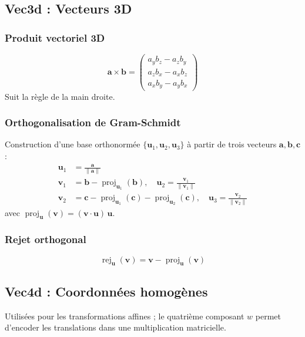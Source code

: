 \documentclass[11pt,a4paper]{article}
\begin{document}
\subsection{Vec3d : Vecteurs 3D}

\subsubsection{Produit vectoriel 3D}
\[
\mathbf{a} \times \mathbf{b} =
\begin{pmatrix}
a_y b_z - a_z b_y \\
a_z b_x - a_x b_z \\
a_x b_y - a_y b_x
\end{pmatrix}
\]
Suit la règle de la main droite.

\subsubsection{Orthogonalisation de Gram-Schmidt}

Construction d'une base orthonormée $\{\mathbf{u}_1, \mathbf{u}_2, \mathbf{u}_3\}$ à partir de trois vecteurs $\mathbf{a}, \mathbf{b}, \mathbf{c}$ :
\begin{align}
\mathbf{u}_1 &= \frac{\mathbf{a}}{\|\mathbf{a}\|} \\
\mathbf{v}_1 &= \mathbf{b} - \operatorname{proj}_{\mathbf{u}_1}(\mathbf{b}), \quad \mathbf{u}_2 = \frac{\mathbf{v}_1}{\|\mathbf{v}_1\|} \\
\mathbf{v}_2 &= \mathbf{c} - \operatorname{proj}_{\mathbf{u}_1}(\mathbf{c}) - \operatorname{proj}_{\mathbf{u}_2}(\mathbf{c}), \quad \mathbf{u}_3 = \frac{\mathbf{v}_2}{\|\mathbf{v}_2\|}
\end{align}
avec $\operatorname{proj}_{\mathbf{u}}(\mathbf{v}) = (\mathbf{v} \cdot \mathbf{u})\,\mathbf{u}$.

\subsubsection{Rejet orthogonal}
\[
\operatorname{rej}_{\mathbf{u}}(\mathbf{v}) = \mathbf{v} - \operatorname{proj}_{\mathbf{u}}(\mathbf{v})
\]

\subsection{Vec4d : Coordonnées homogènes}

Utilisées pour les transformations affines ; le quatrième composant $w$ permet d'encoder les translations dans une multiplication matricielle.
\end{document}
